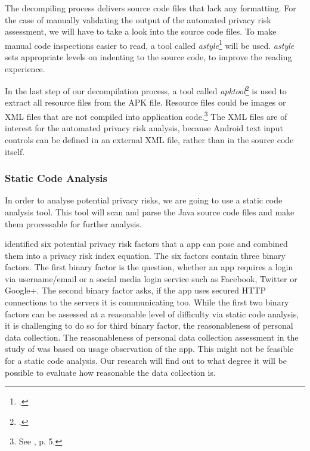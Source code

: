 \documentclass[
	a4paper,
	oneside,
	12pt,
	liststotocnumbered
]{article}
\let\cite\textcite
\begin{document}
The decompiling process delivers source code files that lack any formatting.
For the case of manually validating the output of the automated privacy risk assessment, we will have to take a look into the source code files. 
To make manual code inspections easier to read, a tool called \textit{astyle}\footnote{\cite{Davidson2006}.} will be used. 
\textit{astyle} sets appropriate levels on indenting to the source code, to improve the reading experience.

In the last step of our decompilation process, a tool called \textit{apktool}\footnote{\cite{Tumbleson2010}.} is used to extract all resource files from the \acs{APK} file. Resource files could be images or XML files that are not compiled into application code.\footnote{See \cite{xu2013}, p. 5.}
The XML files are of interest for the automated privacy risk analysis, because Android text input controls can be defined in an external XML file, rather than in the source code itself.

\subsubsection{Static Code Analysis}
In order to analyse potential privacy risks, we are going to use a static code analysis tool.
This tool will scan and parse the Java source code files and make them processable for further analysis.

\cite{Bruggemann2016} identified six potential privacy risk factors that a \mH app can pose and combined them into a privacy risk index equation. 
The six factors contain three binary factors.
The first binary factor is the question, whether an app requires a login via username/email or a social media login service such as Facebook, Twitter or Google+. 
The second binary factor asks, if the app uses secured \acs{HTTP} connections to the servers it is communicating too.
While the first two binary factors can be assessed at a reasonable level of difficulty via static code analysis, it is challenging to do so for third binary factor, the reasonableness of personal data collection. 
The reasonableness of personal data collection assessment in the study of \cite{Bruggemann2016} was based on usage observation of the app. This might not be feasible for a static code analysis. 
Our research will find out to what degree it will be possible to evaluate how reasonable the data collection is.
\end{document}

